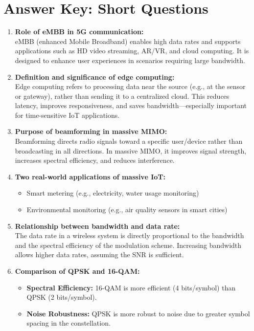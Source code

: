 \documentclass[12pt]{article}
\begin{document}
\newpage
\section*{Answer Key: Short Questions}

\begin{enumerate}
    \item \textbf{Role of eMBB in 5G communication:} \\
    eMBB (enhanced Mobile Broadband) enables high data rates and supports applications such as HD video streaming, AR/VR, and cloud computing. It is designed to enhance user experiences in scenarios requiring large bandwidth.

    \item \textbf{Definition and significance of edge computing:} \\
    Edge computing refers to processing data near the source (e.g., at the sensor or gateway), rather than sending it to a centralized cloud. This reduces latency, improves responsiveness, and saves bandwidth—especially important for time-sensitive IoT applications.

    \item \textbf{Purpose of beamforming in massive MIMO:} \\
    Beamforming directs radio signals toward a specific user/device rather than broadcasting in all directions. In massive MIMO, it improves signal strength, increases spectral efficiency, and reduces interference.

    \item \textbf{Two real-world applications of massive IoT:} 
    \begin{itemize}
        \item Smart metering (e.g., electricity, water usage monitoring)
        \item Environmental monitoring (e.g., air quality sensors in smart cities)
    \end{itemize}

    \item \textbf{Relationship between bandwidth and data rate:} \\
    The data rate in a wireless system is directly proportional to the bandwidth and the spectral efficiency of the modulation scheme. Increasing bandwidth allows higher data rates, assuming the SNR is sufficient.

    \item \textbf{Comparison of QPSK and 16-QAM:} 
    \begin{itemize}
        \item \textbf{Spectral Efficiency:} 16-QAM is more efficient (4 bits/symbol) than QPSK (2 bits/symbol).
        \item \textbf{Noise Robustness:} QPSK is more robust to noise due to greater symbol spacing in the constellation.
    \end{itemize}


\end{enumerate}
\end{document}

